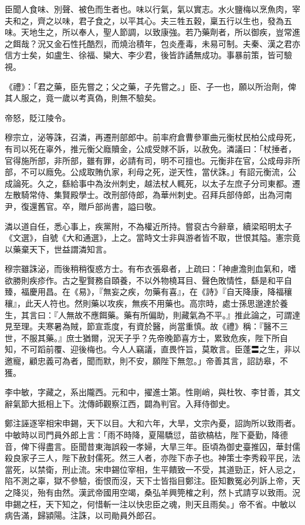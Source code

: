 \begin{pinyinscope}
 臣聞人食味、別聲、被色而生者也。味以行氣，氣以實志。水火鹽梅以烹魚肉，宰夫和之，齊之以味，君子食之，以平其心。夫三牲五穀，稟五行以生也，發為五味。天地生之，所以奉人，聖人節調，以致康強。若乃藥劑者，所以御疾，豈常進之餌哉？況又金石性托酷烈，而燒治積年，包炎產毒，未易可制。夫秦、漢之君亦信方士矣，如盧生、徐福、欒大、李少君，後皆詐譎無成功。事暴前策，皆可驗視。



 《禮》：「君之藥，臣先嘗之；父之藥，子先嘗之。」臣、子一也，願以所治劑，俾其人服之，竟一歲以考真偽，則無不驗矣。



 帝怒，貶江陵令。



 穆宗立，泌等誅，召潾，再遷刑部郎中。前率府倉曹參軍曲元衡杖民柏公成母死，有司以死在辜外，推元衡父廕贖金，公成受賕不訴，以赦免。潾議曰：「杖捶者，官得施所部，非所部，雖有罪，必請有司，明不可擅也。元衡非在官，公成母非所部，不可以廕免。公成取賄仇家，利母之死，逆天性，當伏誅。」有詔元衡流，公成論死。久之，繇給事中為汝州刺史，越法杖人輒死，以太子左庶子分司東都。遷左散騎常侍、集賢殿學士。改刑部侍郎，為華州刺史。召拜兵部侍郎，出為河南尹，復還舊官。卒，贈戶部尚書，謚曰敬。



 潾以道自任，悉心事上，疾黨附，不為權近所持。嘗裒古今辭章，續梁昭明太子《文選》，自號《大和通選》，上之。當時文士非與游者皆不取，世恨其隘。憲宗竟以藥棄天下，世益謂潾知言。



 穆宗雖誅泌，而後稍稍復惑方士。有布衣張皋者，上疏曰：「神慮澹則血氣和，嗜欲勝則疾疹作。古之聖賢務自頤養，不以外物橈耳目、聲色敗情性，繇是和平自臻，福慶用昌。在《易》，『無妄之疾，勿藥有喜』，在《詩》『自天降康，降福穰穰』，此天人符也。然則藥以攻疾，無疾不用藥也。高宗時，處士孫思邈達於養生，其言曰：『人無故不應餌藥。藥有所偏助，則藏氣為不平。』推此論之，可謂達見至理。夫寒暑為賊，節宣乖度，有資於醫，尚當重慎。故《禮》稱：『醫不三世，不服其藥。』庶士猶爾，況天子乎？先帝晚節喜方士，累致危疾，陛下所自知，不可蹈前覆、迎後梅也。今人人竊議，直畏忤旨，莫敢言。臣蓬〓之生，非以邀寵，顧忠義可為者，聞而默，則不安，願陛下無忽。」帝善其言，詔訪皋，不獲。



 李中敏，字藏之，系出隴西。元和中，擢進士第。性剛峭，與杜牧、李甘善，其文辭氣節大抵相上下。沈傳師觀察江西，闢為判官。入拜侍御史。



 鄭注誣逐宰相宋申錫，天下以目。大和六年，大旱，文宗內憂，詔詢所以致雨者。中敏時以司門員外郎上言：「雨不時降，夏陽驕愆，苗欲槁枯，陛下憂勤，降德音，俾下得盡言。臣聞昔東海誤殺一孝婦，大旱三年。臣頃為御史臺推囚，華封儒殺良家子三人，陛下赦封儒死。然三人者，亦陛下赤子也。神策士李秀殺平民，法當死，以禁衛，刑止流。宋申錫位宰相，生平饋致一不受，其道勁正，奸人忌之，陷不測之辜，獄不參驗，銜恨而沒，天下士皆指目鄭注。臣知數冤必列訴上帝，天之降災，殆有由然。漢武帝國用空竭，桑弘羊興筦榷之利，然卜式請亨以致雨。況申錫之枉，天下知之，何惜斬一注以快忠臣之魂，則天且雨矣。」帝不省。中敏以病告滿，歸潁陽。注誅，以司勛員外郎召。




\end{pinyinscope}
